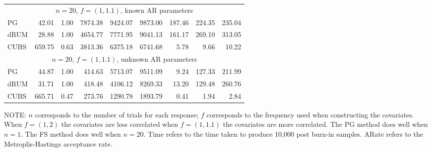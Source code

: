\documentclass[12pt]{article}
\begin{document}
\begin{table}
\begin{center}
\begin{tabular}{l r r r r r r r r }
      \multicolumn{9}{c}{$n=20$, $f = (1,1.1)$, known AR parameters} \\
      PG     &    42.01 &     1.00 &   7874.38 &   9424.07 &   9873.00 &    187.46 &    224.35 &    235.04 \\ 
      dRUM   &    28.88 &     1.00 &   4654.77 &   7771.95 &   9041.13 &    161.17 &    269.10 &    313.05 \\
      CUBS   &   659.75 &     0.63 &   3813.36 &   6375.18 &   6741.68 &      5.78 &      9.66 &     10.22
      \\ %

      \multicolumn{9}{c}{$n=20$, $f = (1,1.1)$, unknown AR parameters} \\
      PG     &    44.87 &     1.00 &    414.63 &   5713.07 &   9511.09 &      9.24 &    127.33 &    211.99 \\
      dRUM   &    31.71 &     1.00 &    418.48 &   4106.12 &   8269.33 &     13.20 &    129.48 &    260.76 \\
      CUBS   &   665.71 &     0.47 &    273.76 &   1290.78 &   1893.79 &      0.41 &      1.94 &      2.84
    \end{tabular}
  \end{center}

  NOTE: $n$ corresponds to the number of trials for each response; $f$ corresponds
  to the frequency used when constructing the covariates.  When $f = (1,2)$ the
  covariates are less correlated when $f=(1,1.1)$ the covariates are more
  correlated.  The PG method does well when $n=1$.  The FS method does well when
  $n=20$.  Time refers to the time taken to produce 10,000 post burn-in samples.
  ARate refers to the Metroplis-Hastings acceptance rate.
\end{table}
\end{document}
